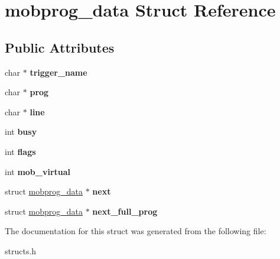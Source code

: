 \hypertarget{structmobprog__data}{\section{mobprog\-\_\-data Struct Reference}
\label{structmobprog__data}
}
\subsection*{Public Attributes}
\begin{DoxyCompactItemize}
\item 
\hypertarget{structmobprog__data_a8c82dd5e0c02cf72982f88cd482cd974}{char $\ast$ {\bfseries trigger\-\_\-name}}\label{structmobprog__data_a8c82dd5e0c02cf72982f88cd482cd974}

\item 
\hypertarget{structmobprog__data_ad47f07fae4eb7e609d5afd35b2355b1d}{char $\ast$ {\bfseries prog}}\label{structmobprog__data_ad47f07fae4eb7e609d5afd35b2355b1d}

\item 
\hypertarget{structmobprog__data_a4d82709d17bf2744c6e14cb836d70a72}{char $\ast$ {\bfseries line}}\label{structmobprog__data_a4d82709d17bf2744c6e14cb836d70a72}

\item 
\hypertarget{structmobprog__data_aed5b719664a71a6802a9853d1a1c613c}{int {\bfseries busy}}\label{structmobprog__data_aed5b719664a71a6802a9853d1a1c613c}

\item 
\hypertarget{structmobprog__data_a8ff527d51c7f34baf992f26576c26e9b}{int {\bfseries flags}}\label{structmobprog__data_a8ff527d51c7f34baf992f26576c26e9b}

\item 
\hypertarget{structmobprog__data_a49bbc3e41c8fdcd14c08729e1fc1b6fb}{int {\bfseries mob\-\_\-virtual}}\label{structmobprog__data_a49bbc3e41c8fdcd14c08729e1fc1b6fb}

\item 
\hypertarget{structmobprog__data_aaa16ae74c608143c69ef7ecb080db55b}{struct \hyperlink{structmobprog__data}{mobprog\-\_\-data} $\ast$ {\bfseries next}}\label{structmobprog__data_aaa16ae74c608143c69ef7ecb080db55b}

\item 
\hypertarget{structmobprog__data_adba12d3319a1406d6ff96e3d2803efd0}{struct \hyperlink{structmobprog__data}{mobprog\-\_\-data} $\ast$ {\bfseries next\-\_\-full\-\_\-prog}}\label{structmobprog__data_adba12d3319a1406d6ff96e3d2803efd0}

\end{DoxyCompactItemize}


The documentation for this struct was generated from the following file\-:\begin{DoxyCompactItemize}
\item 
structs.\-h\end{DoxyCompactItemize}

